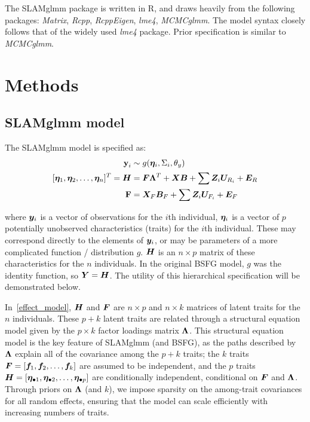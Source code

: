 \documentclass[11pt]{amsart}
\newcommand*{\B}[1]{\ifmmode\bm{#1}\else\textbf{#1}\fi}
\begin{document}
The SLAMglmm package is written in R, and draws heavily from the following packages: \emph{Matrix}, \emph{Rcpp}, \emph{RcppEigen}, \emph{lme4}, \emph{MCMCglmm}. The model syntax closely follows that of the widely used \emph{lme4} package. Prior specification is similar to \emph{MCMCglmm}.


\section{Methods}
\subsection{SLAMglmm model}
The SLAMglmm model is specified as:
\begin{align}
\label{effect_model}
\begin{split}
\B{y}_i &\sim g(\B{\eta}_i,\Sigma_{i},\theta_y) \\
[\B{\eta}_1, \B{\eta}_2, \dots, \B{\eta}_n]^T = \B{H} &=  \B{F}\B{\Lambda}^T + \B{X}\B{B} + \sum \B{Z}_i \B{U}_{R_i} + \B{E}_R \\
\B{F} &= \B{X}_F\B{B}_F + \sum \B{Z}_i \B{U}_{F_i} + \B{E}_F 
\end{split}
\end{align}

\noindent where $\B{y}_i$ is a vector of observations for the $i$th individual, $\B{\eta}_i$ is a vector of $p$ potentially unobserved characteristics (traits) for the $i$th individual. These may correspond directly to the elements of $\B{y}_i$, or may be parameters of a more complicated function / distribution $g$. $\B{H}$ is an $n \times p$ matrix of these characteristics for the $n$ individuals. In the original BSFG model, $g$ was the identity function, so $\B{Y} = \B{H}$. The utility of this hierarchical specification will be demonstrated below.

In~\ref{effect_model}, $\B{H}$ and $\B{F}$ are $n \times p$ and $n \times k$ matrices of latent traits for the $n$ individuals. These $p+k$ latent traits are related through a structural equation model given by the $p \times k$ factor loadings matrix $\B{\Lambda}$.  This structural equation model is the key feature of SLAMglmm (and BSFG), as the paths described by $\B{\Lambda}$ explain all of the covariance among the $p + k$ traits; the $k$ traits $\B{F} = [\B{f}_1, \B{f}_2,\dots, \B{f}_k]$ are assumed to be independent, and the $p$ traits $\B{H} = [\B{\eta}_{\bullet 1}, \B{\eta}_{\bullet 2},\dots,\B{\eta}_{\bullet p}]$ are conditionally independent, conditional on $\B{F}$ and $\B{\Lambda}$. Through priors on $\B{\Lambda}$ (and $k$), we impose sparsity on the among-trait covariances for all random effects, ensuring that the model can scale efficiently with increasing numbers of traits.
\end{document}
